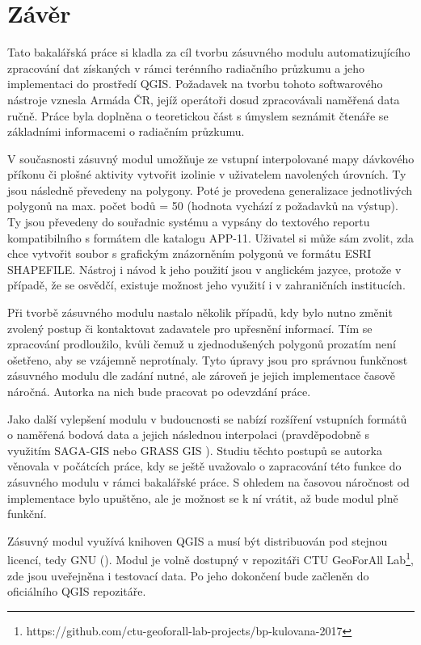 \chapter{Závěr}
\label{5-zaver}


Tato bakalářská práce si kladla za cíl tvorbu zásuvného modulu automatizujícího zpracování dat získaných v rámci terénního radiačního průzkumu a jeho implementaci do prostředí QGIS. Požadavek na tvorbu tohoto softwarového nástroje vznesla Armáda ČR, jejíž operátoři dosud zpracovávali naměřená data ručně. Práce byla doplněna o teoretickou část s úmyslem seznámit čtenáře se základními informacemi o radiačním průzkumu.

V současnosti zásuvný modul umožňuje ze vstupní interpolované mapy dávkového příkonu či plošné aktivity vytvořit izolinie v uživatelem navolených úrovních. Ty jsou následně převedeny na polygony. Poté je provedena generalizace jednotlivých polygonů na max. počet bodů = 50 (hodnota vychází z požadavků na výstup). Ty jsou převedeny do souřadnic systému  a vypsány do textového reportu kompatibilního s formátem dle katalogu APP-11. Uživatel si může sám zvolit, zda chce vytvořit soubor s grafickým znázorněním polygonů ve formátu ESRI SHAPEFILE. Nástroj i návod k jeho použití jsou v anglickém jazyce, protože v případě, že se osvědčí, existuje možnost jeho využití i v zahraničních institucích.

Při tvorbě zásuvného modulu nastalo několik případů, kdy bylo nutno změnit zvolený postup či kontaktovat zadavatele pro upřesnění informací. Tím se zpracování prodloužilo, kvůli čemuž u zjednodušených polygonů prozatím není ošetřeno, aby se vzájemně neprotínaly. Tyto úpravy jsou pro správnou funkčnost zásuvného modulu dle zadání nutné, ale zároveň je jejich implementace časově náročná. Autorka na nich bude pracovat po odevzdání práce.

Jako další vylepšení modulu v budoucnosti se nabízí rozšíření vstupních formátů o naměřená bodová data a jejich následnou interpolaci (pravděpodobně s využitím SAGA-GIS nebo GRASS GIS ). Studiu těchto postupů se autorka věnovala v počátcích práce, kdy se ještě uvažovalo o zapracování této funkce do zásuvného modulu v rámci bakalářské práce. S ohledem na časovou náročnost od implementace bylo upuštěno, ale je možnost se k ní vrátit, až bude modul plně funkční.

Zásuvný modul využívá knihoven QGIS a musí být distribuován pod stejnou licencí, tedy GNU (). Modul je volně dostupný v repozitáři CTU GeoForAll Lab\footnote{https://github.com/ctu-geoforall-lab-projects/bp-kulovana-2017}, zde jsou uveřejněna i testovací data. Po jeho dokončení bude začleněn do oficiálního QGIS repozitáře. 